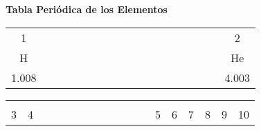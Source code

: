\begin{tcolorbox}[
        colback=colorrds!5!white,
        colframe=colorrds!35!white,
        coltitle=black,
        fonttitle=\bfseries,
        center title,
        title=Tabla Periódica de los Elementos]
    \begin{center}
        \textcolor[rgb]{0.15,0.15,0.55}{{\huge \bf \sc \hspace{-1cm} Tabla Periódica de los Elementos}\\[-0.3cm]}
        \begin{tabular}{|c|p{10.7mm}*{14}{p{9.86mm}}p{12.2mm}|c|}
            \cline{1-1}\cline{18-18}
            {\small 1}                                &  &  &  &  &  &  &  &  &  &  &  &  &  &  &  &  & \small 2                                   \\[-1mm]
            H                                         &  &  &  &  &  &  &  &  &  &  &  &  &  &  &  &  & He                                         \\[-2mm]
            \small \hspace{1.6mm}1.008\hspace{1.65mm} &  &  &  &  &  &  &  &  &  &  &  &  &  &  &  &  & \small \hspace{1.55mm}4.003\hspace{2.25mm} \\\cline{1-2}\cline{13-18}
        \end{tabular}
        \begin{tabular}{|c|c|p{17.8mm}*{9}{p{8.98mm}}|c|c|c|c|c|c|}
                                                       &                                             &  &  &  &  &  &  &  &  &  &  &                                            &                                             &                                           &               &                                           &               \\[-6.6mm]
            \small 3                                   & \small 4                                    &  &  &  &  &  &  &  &  &  &  & \small 5                                   & \small 6                                    & \small 7                                  & \small 8      & \small 9                                  & \small 10     \\[-1mm]

\end{tabular}
\end{center}
\end{tcolorbox}
